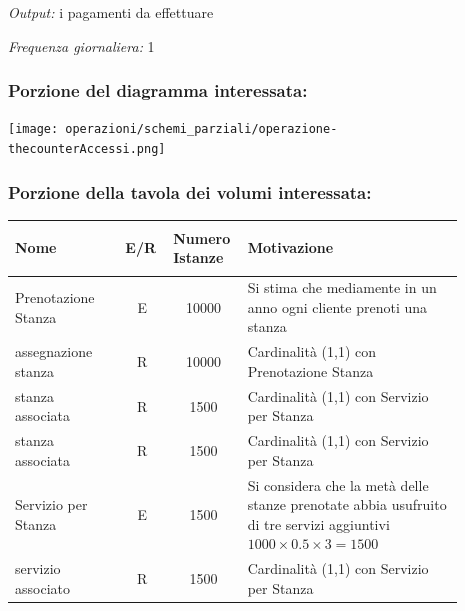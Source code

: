 \documentclass[12pt,a4paper]{article}
\begin{document}
\noindent\textit{Output:} i pagamenti da effettuare

\noindent\textit{Frequenza giornaliera:} 1

\subsubsection*{Porzione del diagramma interessata:}

\texttt{[image: operazioni/schemi\_parziali/operazione-\\thecounterAccessi.png]} 
\subsubsection*{Porzione della tavola dei volumi interessata:}
\begin{center}\setlength{\extrarowheight}{1.5pt}\begin{longtable}{|p{0.23\linewidth}|p{0.1\linewidth}|p{0.11\linewidth}|p{0.45\linewidth}|}
\hline \textbf{Nome}   & \begin{center}\vspace{-15pt}\textbf{E/R}\end{center} & \textbf{Numero Istanze} & \textbf{Motivazione}\\ 
\hline
Prenotazione Stanza
 & 
\multicolumn{1}{|c|}{E}
 & 
\multicolumn{1}{|c|}{10000}
 & 
Si stima che mediamente in un anno ogni cliente prenoti una stanza
\\

\hline
assegnazione stanza
 & 
\multicolumn{1}{|c|}{R}
 & 
\multicolumn{1}{|c|}{10000}
 & 
Cardinalità (1,1) con Prenotazione Stan\-za 
\\

\hline
stanza associata
 & 
\multicolumn{1}{|c|}{R}
 & 
\multicolumn{1}{|c|}{1500}
 & 
Cardinalità (1,1) con Servizio per Stanza
\\

\hline
stanza associata
 & 
\multicolumn{1}{|c|}{R}
 & 
\multicolumn{1}{|c|}{1500}
 & 
Cardinalità (1,1) con Servizio per Stanza
\\

\hline
Servizio per Stanza
 & 
\multicolumn{1}{|c|}{E}
 & 
\multicolumn{1}{|c|}{1500}
 & 
Si considera che la metà delle stanze prenotate abbia usufruito di tre servizi aggiuntivi $1000\times 0.5 \times 3 = 1500$
\\

\hline
servizio associato
 & 
\multicolumn{1}{|c|}{R}
 & 
\multicolumn{1}{|c|}{1500}
 & 
Cardinalità (1,1) con Servizio per Stanza
\\


\end{longtable}
\end{center}
\end{document}
